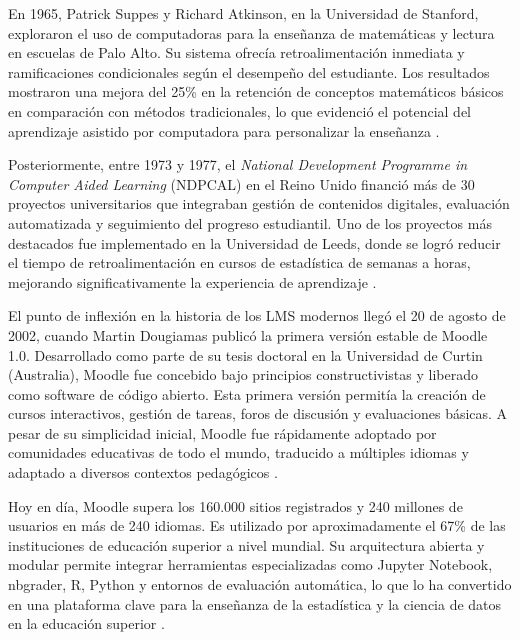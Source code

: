 \documentclass[letter,oneside,12pt,spanish]{report}
\begin{document}
En 1965, Patrick Suppes y Richard Atkinson, en la Universidad de Stanford, exploraron el uso de computadoras para la enseñanza de matemáticas y lectura en escuelas de Palo Alto. Su sistema ofrecía retroalimentación inmediata y ramificaciones condicionales según el desempeño del estudiante. Los resultados mostraron una mejora del 25\% en la retención de conceptos matemáticos básicos en comparación con métodos tradicionales, lo que evidenció el potencial del aprendizaje asistido por computadora para personalizar la enseñanza \parencite{Suppes1966}.

Posteriormente, entre 1973 y 1977, el \textit{National Development Programme in Computer Aided Learning} (NDPCAL) en el Reino Unido financió más de 30 proyectos universitarios que integraban gestión de contenidos digitales, evaluación automatizada y seguimiento del progreso estudiantil. Uno de los proyectos más destacados fue implementado en la Universidad de Leeds, donde se logró reducir el tiempo de retroalimentación en cursos de estadística de semanas a horas, mejorando significativamente la experiencia de aprendizaje \parencite{Hooper1977}.

El punto de inflexión en la historia de los LMS modernos llegó el 20 de agosto de 2002, cuando Martin Dougiamas publicó la primera versión estable de Moodle 1.0. Desarrollado como parte de su tesis doctoral en la Universidad de Curtin (Australia), Moodle fue concebido bajo principios constructivistas y liberado como software de código abierto. Esta primera versión permitía la creación de cursos interactivos, gestión de tareas, foros de discusión y evaluaciones básicas. A pesar de su simplicidad inicial, Moodle fue rápidamente adoptado por comunidades educativas de todo el mundo, traducido a múltiples idiomas y adaptado a diversos contextos pedagógicos \parencite{Moodle2024}.

Hoy en día, Moodle supera los 160.000 sitios registrados y 240 millones de usuarios en más de 240 idiomas. Es utilizado por aproximadamente el 67\% de las instituciones de educación superior a nivel mundial. Su arquitectura abierta y modular permite integrar herramientas especializadas como Jupyter Notebook, nbgrader, R, Python y entornos de evaluación automática, lo que lo ha convertido en una plataforma clave para la enseñanza de la estadística y la ciencia de datos en la educación superior \parencite{Goh2025, Moodle2024}.
\end{document}
